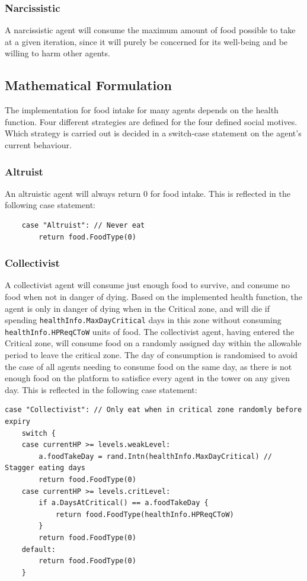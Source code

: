 \subsubsection{Narcissistic}
A narcissistic agent will consume the maximum amount of food possible to take at a given iteration, since it will purely be concerned for its well-being and be willing to harm other agents.

\subsection{Mathematical Formulation}
The implementation for food intake for many agents depends on the health function. Four different strategies are defined for the four defined social motives. Which strategy is carried out is decided in a switch-case statement on the agent's current behaviour.

\subsubsection{Altruist}
An altruistic agent will always return 0 for food intake. This is reflected in the following case statement:

\begin{verbatim}
    case "Altruist": // Never eat
        return food.FoodType(0)
\end{verbatim}

\subsubsection{Collectivist}
A collectivist agent will consume just enough food to survive, and consume no food when not in danger of dying. Based on the implemented health function, the agent is only in danger of dying when in the Critical zone, and will die if spending \texttt{healthInfo.MaxDayCritical} days in this zone without consuming \texttt{healthInfo.HPReqCToW} units of food. The collectivist agent, having entered the Critical zone, will consume food on a randomly assigned day within the allowable period to leave the critical zone. The day of consumption is randomised to avoid the case of all agents needing to consume food on the same day, as there is not enough food on the platform to satisfice every agent in the tower on any given day. This is reflected in the following case statement:

\begin{verbatim}
case "Collectivist": // Only eat when in critical zone randomly before expiry
    switch {
    case currentHP >= levels.weakLevel:
        a.foodTakeDay = rand.Intn(healthInfo.MaxDayCritical) // Stagger eating days
	    return food.FoodType(0)
    case currentHP >= levels.critLevel:
        if a.DaysAtCritical() == a.foodTakeDay {
            return food.FoodType(healthInfo.HPReqCToW)
        }
        return food.FoodType(0)
    default:
        return food.FoodType(0)
    }
\end{verbatim}

